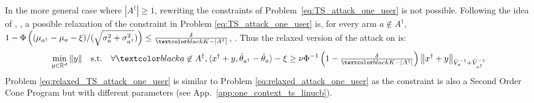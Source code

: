 In the more general case where $|A^{\dagger}|\geq 1$, rewriting the constraints of Problem~\eqref{eq:TS_attack_one_user} is not possible. Following the idea of \cite{liu2019data}, , a possible relaxation of the constraint in Problem \eqref{eq:TS_attack_one_user} is,  for every arm $a\not\in A^\dagger$,    $ 1 - \Phi\left( (\mu_{a^{\dagger}} - \mu_{a} - \xi)/(\sqrt{\sigma_{a}^{2} + \sigma_{a^{\dagger}}^{2}})\right) \leq \frac{\delta}{\changelm{K-|A^\dagger|}}$, .
Thus the relaxed version of the attack on \lints {} is:
\begin{align}
\min_{y\in \mathbb{R}^{d}} \| y \|  
 \quad \text{s.t.} \quad  \forall \changebrtwo{a\not\in A^{\dagger}},\langle x^{\dagger}+y, \hat{\theta}_{a^{\dagger}} - \hat{\theta}_{a}\rangle - \xi  \geq \nu\Phi^{-1}\left(1 - \tfrac{\delta}{\changelm{K-|A^\dagger|}}\right)\big\| x^{\dagger} + y \big\|_{\bar{V}_{a}^{-1} + \bar{V}_{a^{\dagger}}^{-1}} \label{eq:relaxed_TS_attack_one_user}
\end{align} 
Problem \eqref{eq:relaxed_TS_attack_one_user} is similar to Problem \eqref{eq:relaxed_attack_one_user} as the constraint is also a Second Order Cone Program but with different parameters (see App.~\ref{app:one_context_ts_linucb}). 
